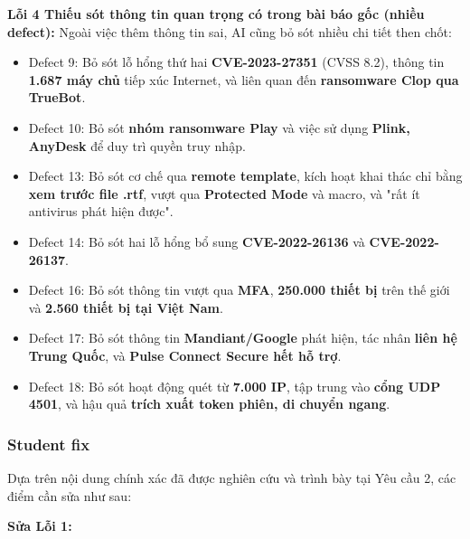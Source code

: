 \vspace{0.2cm}

\textbf{Lỗi 4  Thiếu sót thông tin quan trọng có trong bài báo gốc (nhiều defect):} Ngoài việc thêm thông tin sai, AI cũng bỏ sót nhiều chi tiết then chốt:

\begin{itemize}
    \item Defect 9: Bỏ sót lỗ hổng thứ hai \textbf{CVE-2023-27351} (CVSS 8.2), thông tin \textbf{1.687 máy chủ} tiếp xúc Internet, và liên quan đến \textbf{ransomware Clop qua TrueBot}.
    \item Defect 10: Bỏ sót \textbf{nhóm ransomware Play} và việc sử dụng \textbf{Plink, AnyDesk} để duy trì quyền truy nhập.
    \item Defect 13: Bỏ sót cơ chế qua \textbf{remote template}, kích hoạt khai thác chỉ bằng \textbf{xem trước file .rtf}, vượt qua \textbf{Protected Mode} và macro, và "rất ít antivirus phát hiện được".
    \item Defect 14: Bỏ sót hai lỗ hổng bổ sung \textbf{CVE-2022-26136} và \textbf{CVE-2022-26137}.
    \item Defect 16: Bỏ sót thông tin vượt qua \textbf{MFA}, \textbf{250.000 thiết bị} trên thế giới và \textbf{2.560 thiết bị tại Việt Nam}.
    \item Defect 17: Bỏ sót thông tin \textbf{Mandiant/Google} phát hiện, tác nhân \textbf{liên hệ Trung Quốc}, và \textbf{Pulse Connect Secure hết hỗ trợ}.
    \item Defect 18: Bỏ sót hoạt động quét từ \textbf{7.000 IP}, tập trung vào \textbf{cổng UDP 4501}, và hậu quả \textbf{trích xuất token phiên, di chuyển ngang}.
\end{itemize}

\subsubsection{Student fix}

Dựa trên nội dung chính xác đã được nghiên cứu và trình bày tại Yêu cầu 2, các điểm cần sửa như sau:

\vspace{0.2cm}

\textbf{Sửa Lỗi 1:}

